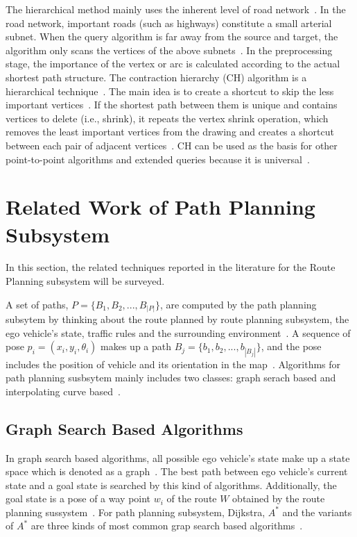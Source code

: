 \documentclass[conference]{IEEEtran}
\begin{document}
The hierarchical method mainly uses the inherent level of road network~\cite{bast2016route}. In the road network, important roads (such as highways) constitute a small arterial subnet. When the query algorithm is far away from the source and target, the algorithm only scans the vertices of the above subnets~\cite{bast2016route}. In the preprocessing stage, the importance of the vertex or arc is calculated according to the actual shortest path structure. The contraction hierarchy (CH) algorithm is a hierarchical technique~\cite{geisberger2012exact}. The main idea is to create a shortcut to skip the less important vertices~\cite{geisberger2012exact}. If the shortest path between them is unique and contains vertices to delete (i.e., shrink), it repeats the vertex shrink operation, which removes the least important vertices from the drawing and creates a shortcut between each pair of adjacent vertices~\cite{geisberger2012exact}. CH can be used as the basis for other point-to-point algorithms and extended queries because it is universal~\cite{geisberger2012exact}.


\section{Related Work of Path Planning Subsystem}\label{sec:path_planner}
In this section, the related techniques reported in the literature for the Route Planning subsystem will be surveyed.

A set of paths, $P=\{B_1, B_2,..., B_{|P|}\}$, are computed by the path planning subsytem by thinking about the route planned by route planning subsystem, the ego vehicle's state, traffic rules and the surrounding environment~\cite{self_driving}. A sequence of pose $p_i=(x_i, y_i, \theta_i)$ makes up a path $B_j=\{b_1, b_2, ..., b_{|B_j|}\}$, and the pose includes the position of vehicle and its orientation in the map~\cite{self_driving}. Algorithms for path planning susbsytem mainly includes two classes: graph serach based and interpolating curve based~\cite{self_driving}.

\subsection{Graph Search Based Algorithms}
In graph search based algorithms, all possible ego vehicle's state make up a state space which is denoted as a graph~\cite{gonzalez2015review}. The best path between ego vehicle's current state and a goal state is searched by this kind of algorithms. Additionally, the goal state is a pose of a way point $w_i$ of the route $W$ obtained by the route planning sussystem~\cite{gonzalez2015review}. For path planning subsystem, Dijkstra, $A^*$ and the variants of $A^*$ are three kinds of most common grap search based algorithms~\cite{self_driving}.
\end{document}
